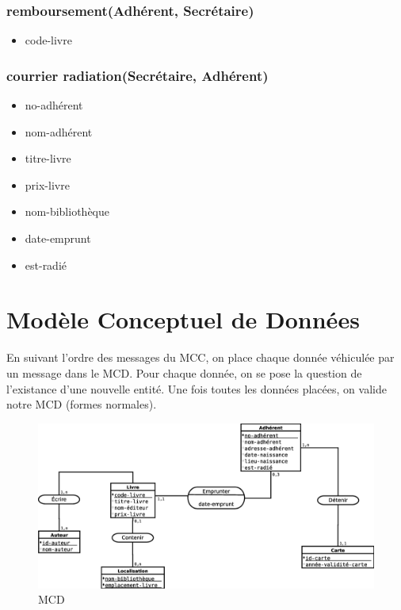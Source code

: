 \subsubsection*{remboursement(Adhérent, Secrétaire)}
\begin{itemize}
    \item code-livre
\end{itemize}

\subsubsection*{courrier radiation(Secrétaire, Adhérent)}
\begin{itemize}
    \item no-adhérent
    \item nom-adhérent
    \item titre-livre
    \item prix-livre
    \item nom-bibliothèque
    \item date-emprunt
    \item est-radié
\end{itemize}

\newpage
\section*{Modèle Conceptuel de Données}

En suivant l'ordre des messages du MCC, on place chaque donnée véhiculée par un message dans le MCD. Pour chaque donnée, on se pose la question de l'existance d'une nouvelle entité. Une fois toutes les données placées, on valide notre MCD (formes normales).

\begin{figure}[!htb]
    \begin{center}
    \includegraphics[width=11.5cm]{images/cc1_mcd.eps}
    \caption{\label{cc1_mcd} MCD}
    \end{center}
\end{figure}

